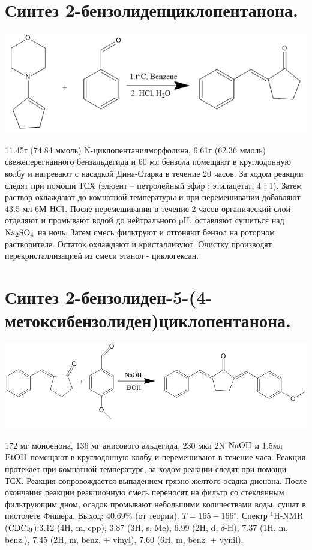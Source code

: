 \documentclass[a4paper]{article}
\begin{document}
\section{Синтез 2-бензолиденциклопентанона.}
\begin{center}
\includegraphics[scale=0.5]{pictures/1.png}
\end{center}
11.45г (74.84 ммоль) N-циклопентанилморфолина, 6.61г (62.36 ммоль) свежеперегнанного бензальдегида и 60 мл бензола помещают в круглодонную колбу и нагревают с насадкой Дина-Старка в течение 20 часов. За ходом реакции следят при помощи ТСХ (элюент -- петролейный эфир : этилацетат, 4 : 1).
Затем раствор охлаждают до комнатной температуры и при перемешивании добавляют 43.5 мл 6М $\ce{HCl}$. После перемешивания в течение 2 часов органический слой отделяют и промывают водой до нейтрального pH, оставляют сушиться над $\ce{Na2SO4}$ на ночь. Затем смесь фильтруют и отгоняют бензол на роторном растворителе. Остаток охлаждают и кристаллизуют. Очистку производят перекристаллизацией из смеси этанол - циклогексан.

\section{Синтез 2-бензолиден-5-(4-метоксибензолиден)циклопентанона.}
\begin{center}
\includegraphics[scale=0.35]{pictures/2.png}
\end{center}
172 мг  моноенона, 136 мг анисового альдегида, 230 мкл 2N $\ce{NaOH}$ и 1.5мл $\ce{EtOH}$ помещают в круглодонную колбу и перемешивают в течение часа. Реакция протекает при комнатной температуре, за ходом реакции следят при помощи ТСХ. Реакция сопровождается выпадением грязно-желтого осадка диенона. После окончания реакции реакционную смесь переносят на фильтр со стеклянным фильтрующим дном, осадок промывают небольшими количествами воды, сушат в пистолете Фишера. 
Выход: 40.69$\%$ (от теории).
$T = 165-166^{\circ}$.
Спектр $^{1}$H-NMR ($\ce{CDCl3}$):3.12 (4H, m, cpp), 3.87 (3H, s, Me), 6.99 (2H, d, $\delta$-H), 7.37 (1H, m, benz.), 7.45 (2H, m, benz. + vinyl), 7.60 (6H, m, benz. + vynil).
\end{document}
